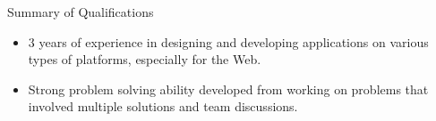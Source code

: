 \documentclass[]{mcdowellcv}
\begin{document}
	\makeheader
	
	\begin{cvsection}{Summary of Qualifications}
    \begin{cvsubsection}{}{}{}
      \begin{itemize}
        \item 3 years of experience in designing and developing applications on
          various types of platforms, especially for the Web.
        \item Strong problem solving ability developed from working on problems
          that involved multiple solutions and team discussions.
      \end{itemize}
    \end{cvsubsection}
  \end{cvsection}
\end{document}
